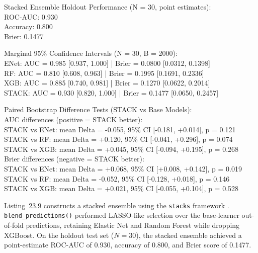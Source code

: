 \documentclass[11pt,oneside]{book}
\begin{document}
\begin{routput}
Stacked Ensemble Holdout Performance (N = 30, point estimates):\\
\hspace*{2em}ROC-AUC:  0.930\\
\hspace*{2em}Accuracy: 0.800\\
\hspace*{2em}Brier:    0.1477

Marginal 95\% Confidence Intervals (N = 30, B = 2000):\\
\hspace*{2em}ENet:  AUC = 0.985 [0.937, 1.000] | Brier = 0.0800 [0.0312, 0.1398]\\
\hspace*{2em}RF:    AUC = 0.810 [0.608, 0.963] | Brier = 0.1995 [0.1691, 0.2336]\\
\hspace*{2em}XGB:   AUC = 0.885 [0.740, 0.981] | Brier = 0.1270 [0.0622, 0.2014]\\
\hspace*{2em}STACK: AUC = 0.930 [0.820, 1.000] | Brier = 0.1477 [0.0650, 0.2457]

Paired Bootstrap Difference Tests (STACK vs Base Models):\\
AUC differences (positive = STACK better):\\
\hspace*{2em}STACK vs ENet: mean Delta = -0.055, 95\% CI [-0.181, +0.014], p = 0.121\\
\hspace*{2em}STACK vs RF:   mean Delta = +0.120, 95\% CI [-0.041, +0.296], p = 0.074\\
\hspace*{2em}STACK vs XGB:  mean Delta = +0.045, 95\% CI [-0.094, +0.195], p = 0.268\\
Brier differences (negative = STACK better):\\
\hspace*{2em}STACK vs ENet: mean Delta = +0.068, 95\% CI [+0.008, +0.142], p = 0.019\\
\hspace*{2em}STACK vs RF:   mean Delta = -0.052, 95\% CI [-0.128, +0.018], p = 0.146\\
\hspace*{2em}STACK vs XGB:  mean Delta = +0.021, 95\% CI [-0.055, +0.104], p = 0.528
\end{routput}

Listing~23.9 constructs a stacked ensemble using the \texttt{stacks} framework \cite{wolpert1992stacked, breiman1996stacked}. \texttt{blend\_predictions()} performed LASSO-like selection over the base-learner out-of-fold predictions, retaining Elastic Net and Random Forest while dropping XGBoost. On the holdout test set ($N = 30$), the stacked ensemble achieved a point-estimate ROC-AUC of 0.930, accuracy of 0.800, and Brier score of 0.1477.
\end{document}
